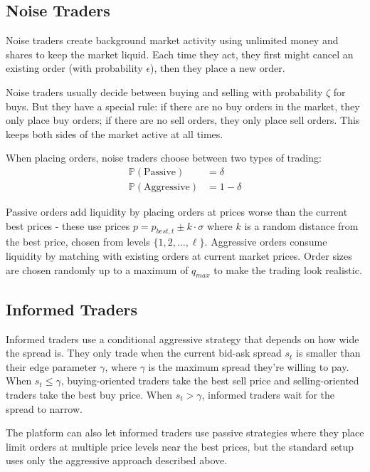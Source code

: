 \subsection{Noise Traders}

Noise traders create background market activity using unlimited money and shares to keep the market liquid. Each time they act, they first might cancel an existing order (with probability $\epsilon$), then they place a new order.

Noise traders usually decide between buying and selling with probability $\zeta$ for buys. But they have a special rule: if there are no buy orders in the market, they only place buy orders; if there are no sell orders, they only place sell orders. This keeps both sides of the market active at all times.

When placing orders, noise traders choose between two types of trading:
\begin{align}
\mathbb{P}(\text{Passive}) &= \delta \\
\mathbb{P}(\text{Aggressive}) &= 1 - \delta
\end{align}

Passive orders add liquidity by placing orders at prices worse than the current best prices - these use prices $p = p_{best,t} \pm k \cdot \sigma$ where $k$ is a random distance from the best price, chosen from levels $\{1, 2, \ldots, \ell\}$. Aggressive orders consume liquidity by matching with existing orders at current market prices. Order sizes are chosen randomly up to a maximum of $q_{max}$ to make the trading look realistic.

\subsection{Informed Traders}

Informed traders use a conditional aggressive strategy that depends on how wide the spread is. They only trade when the current bid-ask spread $s_t$ is smaller than their edge parameter $\gamma$, where $\gamma$ is the maximum spread they're willing to pay. When $s_t \leq \gamma$, buying-oriented traders take the best sell price and selling-oriented traders take the best buy price. When $s_t > \gamma$, informed traders wait for the spread to narrow.

The platform can also let informed traders use passive strategies where they place limit orders at multiple price levels near the best prices, but the standard setup uses only the aggressive approach described above.

